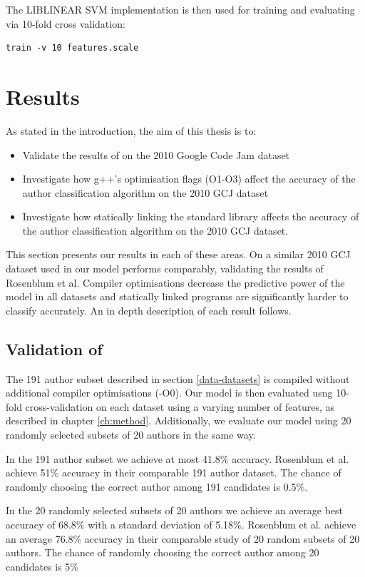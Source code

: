 \documentclass[a4paper,11pt]{kth-mag}
\begin{document}
The LIBLINEAR SVM implementation is then used \parencite{fan2008liblinear} for
training and evaluating via 10-fold cross validation:
\begin{lstlisting}
train -v 10 features.scale
\end{lstlisting}


\chapter{Results}
As stated in the introduction, the aim of this thesis is to:
\begin{itemize}
\item Validate the results of \parencite{rosenblum2011wrote} on the 2010 Google
      Code Jam dataset
\item Investigate how g++’s optimisation flags (O1-O3) affect the accuracy of
      the author classification algorithm on the 2010 GCJ dataset
\item Investigate how statically linking the standard library affects the
      accuracy of the author classification algorithm on the 2010 GCJ dataset.
\end{itemize}

This section presents our results in each of these areas. On a similar 2010 GCJ
dataset used in \parencite{rosenblum2011wrote} our model performs comparably,
validating the results of Rosenblum et al. Compiler optimisations decrease the
predictive power of the model in all datasets and statically linked programs
are significantly harder to classify accurately. An in depth description of
each result follows.

\section{Validation of \parencite{rosenblum2011wrote}}
The 191 author subset described in section \ref{data-datasets} is
compiled without additional compiler optimisations (-O0). Our model is then
evaluated usng 10-fold cross-validation on each dataset using a varying number
of features, as described in chapter \ref{ch:method}. Additionally, we evaluate
our model using 20 randomly selected subsets of 20 authors in the same way.

In the 191 author subset we achieve at most 41.8\% accuracy. Rosenblum et al.
achieve 51\% accuracy in their comparable 191 author dataset. The chance of
randomly choosing the correct author among 191 candidates is 0.5\%.

In the 20 randomly selected subsets of 20 authors we achieve an average best
accuracy of 68.8\% with a standard deviation of 5.18\%. Rosenblum et al.
achieve an average 76.8\% accuracy in their comparable study of 20 random
subsets of 20 authors. The chance of randomly choosing the correct author
among 20 candidates is 5\%
\end{document}
